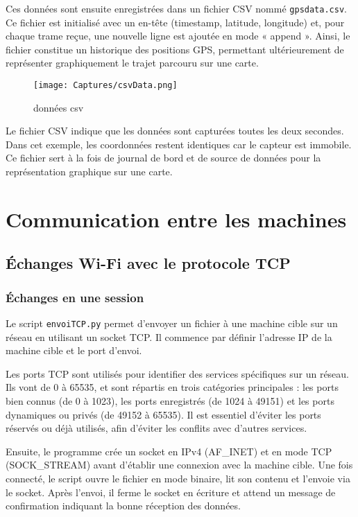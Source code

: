 \documentclass[a4paper,11pt]{article}
\begin{document}
Ces données sont ensuite enregistrées dans un fichier CSV nommé \texttt{gpsdata.csv}. Ce fichier est initialisé avec un en-tête (timestamp, latitude, longitude) et, pour chaque trame reçue, une nouvelle ligne est ajoutée en mode « append ». Ainsi, le fichier constitue un historique des positions GPS, permettant ultérieurement de représenter graphiquement le trajet parcouru sur une carte.

\begin{figure}[H]
    \centering
    \texttt{[image: Captures/csvData.png]}
    \caption{données csv}
    \label{fig:enter-label}
\end{figure}

\FloatBarrier

Le fichier CSV indique que les données sont capturées toutes les deux secondes. Dans cet exemple, les coordonnées restent identiques car le capteur est immobile. Ce fichier sert à la fois de journal de bord et de source de données pour la représentation graphique sur une carte.

\section{Communication entre les machines}

\subsection{Échanges Wi-Fi avec le protocole TCP}

\subsubsection{Échanges en une session}
Le script \texttt{envoiTCP.py} permet d’envoyer un fichier à une machine cible sur un réseau en utilisant un socket TCP. Il commence par définir l’adresse IP de la machine cible et le port d’envoi. 

Les ports TCP sont utilisés pour identifier des services spécifiques sur un réseau. Ils vont de 0 à 65535, et sont répartis en trois catégories principales : les ports bien connus (de 0 à 1023), les ports enregistrés (de 1024 à 49151) et les ports dynamiques ou privés (de 49152 à 65535).  Il est essentiel d’éviter les ports réservés ou déjà utilisés, afin d'éviter les conflits avec d'autres services.

Ensuite, le programme crée un socket en IPv4 (AF\_INET) et en mode TCP (SOCK\_STREAM) avant d’établir une connexion avec la machine cible. Une fois connecté, le script ouvre le fichier en mode binaire, lit son contenu et l’envoie via le socket. Après l’envoi, il ferme le socket en écriture et attend un message de confirmation indiquant la bonne réception des données. 
\end{document}

